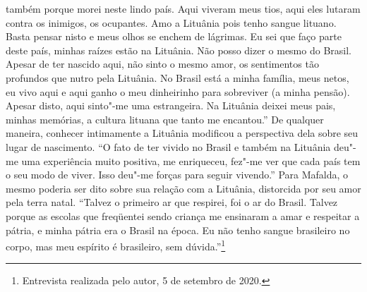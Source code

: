 {também porque morei neste lindo país. Aqui viveram meus tios, aqui eles
lutaram contra os inimigos, os ocupantes. Amo a Lituânia pois tenho
sangue lituano. Basta pensar nisto e meus olhos se enchem de lágrimas.
Eu sei que faço parte deste país, minhas raízes estão na Lituânia. Não
posso dizer o mesmo do Brasil. Apesar de ter nascido aqui, não sinto o
mesmo amor, os sentimentos tão profundos que nutro pela Lituânia. No
Brasil está a minha família, meus netos, eu vivo aqui e aqui ganho o meu
dinheirinho para sobreviver (a minha pensão). Apesar disto, aqui
sinto"-me uma estrangeira. Na Lituânia deixei meus pais, minhas memórias,
a cultura lituana que tanto me encantou.'' De qualquer maneira, conhecer
intimamente a Lituânia modificou a perspectiva dela sobre seu lugar de
nascimento. ``O fato de ter vivido no Brasil e também na Lituânia deu"-me
uma experiência muito positiva, me enriqueceu, fez"-me ver que cada país
tem o seu modo de viver. Isso deu"-me forças para seguir vivendo.'' Para
Mafalda, o mesmo poderia ser dito sobre sua relação com a Lituânia,
distorcida por seu amor pela terra natal. ``Talvez o primeiro ar que
respirei, foi o ar do Brasil. Talvez porque as escolas que freqüentei
sendo criança me ensinaram a amar e respeitar a pátria, e minha pátria
era o Brasil na época. Eu não tenho sangue brasileiro no corpo, mas meu
espírito é brasileiro, sem dúvida.''\footnote{Entrevista realizada pelo
  autor, 5 de setembro de 2020.}

}
